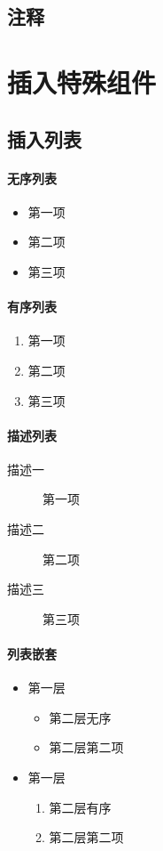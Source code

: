 \documentclass[12pt, a4paper, oneside]{ctexart}
\begin{document}
\subsection{注释}

\section{插入特殊组件}
\subsection{插入列表}
\paragraph{无序列表}
\begin{itemize}
    \item 第一项
    \item 第二项
    \item 第三项
\end{itemize}
\paragraph{有序列表}
\begin{enumerate}
    \item 第一项
    \item 第二项
    \item 第三项
\end{enumerate}
\paragraph{描述列表}
\begin{description}
    \item[描述一] 第一项
    \item[描述二] 第二项
    \item[描述三] 第三项
\end{description}

\paragraph{列表嵌套}
\begin{itemize}
    \item 第一层
    \begin{itemize}
        \item 第二层无序
        \item 第二层第二项
    \end{itemize}
    \item 第一层
    \begin{enumerate}
        \item 第二层有序
        \item 第二层第二项
    \end{enumerate}
\end{itemize}

\end{document}
\end{document}
